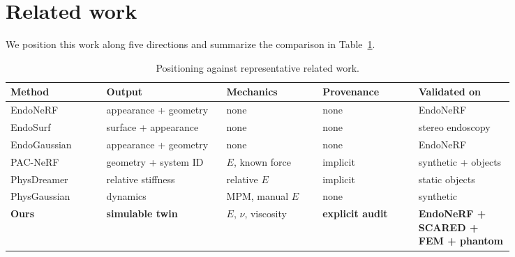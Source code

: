 \documentclass[review]{elsarticle}
\begin{document}
\section{Related work}
\label{sec:related}

We position this work along five directions and summarize the comparison in
Table~\ref{tab:position}.

\begin{table}[htbp]
\centering
\caption{Positioning against representative related work.}
\label{tab:position}
\small
\begin{tabular}{@{}p{0.16\linewidth}p{0.20\linewidth}p{0.16\linewidth}p{0.16\linewidth}p{0.16\linewidth}@{}}
\toprule
Method & Output & Mechanics & Provenance & Validated on \\
\midrule
EndoNeRF \citep{endonerf} & appearance + geometry & none & none & EndoNeRF \\
EndoSurf \citep{endosurf} & surface + appearance & none & none & stereo endoscopy \\
EndoGaussian \citep{endogaussian} & appearance + geometry & none & none & EndoNeRF \\
PAC-NeRF \citep{pacnerf} & geometry + system ID & $E$, known force & implicit & synthetic + objects \\
PhysDreamer \citep{physdreamer} & relative stiffness & relative $E$ & implicit & static objects \\
PhysGaussian \citep{physgaussian} & dynamics & MPM, manual $E$ & none & synthetic \\
\textbf{Ours} & \textbf{simulable twin} & $E$, $\nu$, viscosity & \textbf{explicit audit} & \textbf{EndoNeRF + SCARED + FEM + phantom} \\
\bottomrule
\end{tabular}
\end{table}
\end{document}
